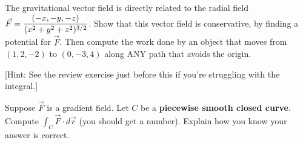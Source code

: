 \begin{problem}
 The gravitational vector field is directly related to the radial field $\displaystyle\vec F = \frac{\left(-x,-y,-z\right)}{(x^2+y^2+z^2)^{3/2}}$. Show that this vector field is conservative, by finding a potential for $\vec F$.  Then compute the work done by an object that moves from $(1,2,-2)$ to $(0,-3,4)$ along ANY path that avoids the origin. 

[Hint: See the review exercise just before this if you're struggling with the integral.]
\end{problem}


\begin{problem}
 Suppose $\vec F$ is a gradient field.  Let $C$ be a \textbf{piecewise smooth closed curve}. Compute $\int_C \vec F\cdot d\vec r$ (you should get a number). Explain how you know your answer is correct.
\end{problem}


\newpage



